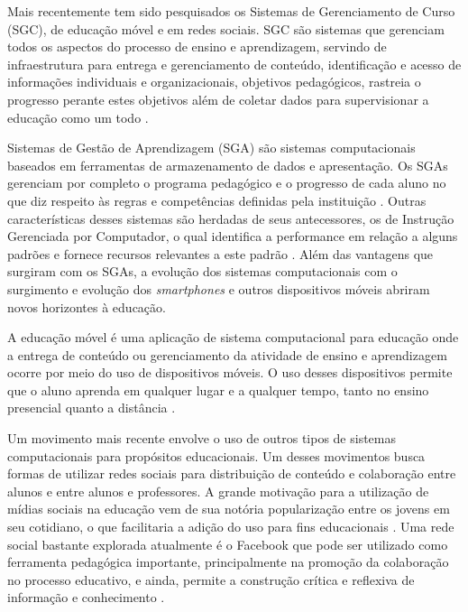 Mais recentemente tem sido pesquisados os Sistemas de Gerenciamento de Curso (SGC), de educação móvel e em redes sociais. SGC são sistemas que gerenciam todos os aspectos do processo de ensino e aprendizagem, servindo de infraestrutura para entrega e gerenciamento de conteúdo, identificação e acesso de informações individuais e organizacionais, objetivos pedagógicos, rastreia o progresso perante estes objetivos além de coletar dados para supervisionar a educação como um todo \cite{flescher02}.

Sistemas de Gestão de Aprendizagem (SGA) são sistemas computacionais baseados em ferramentas de armazenamento de dados e apresentação. Os SGAs gerenciam por completo o programa pedagógico e o progresso de cada aluno no que diz respeito às regras e competências definidas pela instituição \cite{flescher02}. Outras características desses sistemas são herdadas de seus antecessores, os de Instrução Gerenciada por Computador, o qual identifica a performance em relação a alguns padrões e fornece recursos relevantes a este padrão \cite{flescher02}. Além das vantagens que surgiram com os SGAs, a evolução dos sistemas computacionais com o surgimento e evolução dos \emph{smartphones} e outros dispositivos móveis abriram novos horizontes à educação.


A educação móvel é uma aplicação de sistema computacional para educação onde a entrega de conteúdo ou gerenciamento da atividade de ensino e aprendizagem ocorre por meio do uso de dispositivos móveis. O uso desses dispositivos permite que o aluno aprenda em qualquer lugar e a qualquer tempo, tanto no ensino presencial quanto a distância \cite{mlearning09}.

Um movimento mais recente envolve o uso de outros tipos de sistemas computacionais para propósitos educacionais. Um desses movimentos busca formas de utilizar redes sociais para distribuição de conteúdo e colaboração entre alunos e entre alunos e professores. A grande motivação para a utilização de mídias sociais na educação vem de sua notória popularização entre os jovens em seu cotidiano, o que facilitaria a adição do uso para fins educacionais \cite{dotta_uso_2011}. Uma rede social bastante explorada atualmente é o Facebook que pode ser utilizado como ferramenta pedagógica importante, principalmente na promoção da colaboração no processo educativo, e ainda, permite a construção crítica e reflexiva de informação e conhecimento \cite{facebook11}.

